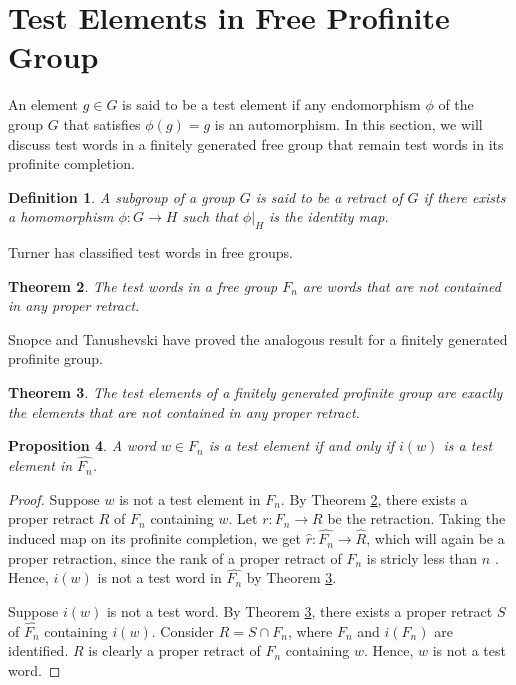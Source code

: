 \documentclass[12pt]{amsart}
\newtheorem{theorem}{Theorem}[section]
\newtheorem{definition}[theorem]{Definition}
\newtheorem{pro}[theorem]{Proposition}
\begin{document}
\section{Test Elements in Free Profinite Group}

An element $g \in G$ is said to be a test element if any endomorphism $\phi$ of the group $G$ that satisfies $\phi(g) = g$ is an automorphism. In this section, we will discuss test words in a finitely generated free group that remain test words in its profinite completion.

\begin{definition}
    A subgroup of a group $G$ is said to be a retract of $G$ if there exists a homomorphism $\phi: G \longrightarrow H$ such that $\phi\vert_H$ is the identity map. 
\end{definition}
Turner has classified test words in free groups.

\begin{theorem}\cite{Turner}\label{turner1}
    The test words in a free group $F_n$ are words that are not contained in any proper retract.
\end{theorem}
Snopce and Tanushevski have proved the analogous result for a finitely generated profinite group.

\begin{theorem}\cite[Theorem~3.5]{snopce2017test}\label{snopce}
The test elements of a finitely generated profinite group are exactly the elements that are not contained in any proper retract.    
\end{theorem}


\begin{pro}\label{prof}
    A word $w \in F_n$ is a test element if and only if $i(w)$ is a test element in $\widehat{F_n}$.  
\end{pro}

\begin{proof}
    Suppose $w$ is not a test element in $F_n$. By Theorem \ref{turner1}, there exists a proper retract $R$ of $F_n$ containing $w$. Let $r: F_n \longrightarrow R$ be the retraction. Taking the induced map on its profinite completion, we get $\widehat{r} : \widehat{F_n} \longrightarrow \widehat{R}$, which will again be a proper retraction, since the rank of a proper retract of $F_n$ is stricly less than $n$ \cite{Turner}. Hence, $i(w)$ is not a test word in $\widehat{F_n}$ by Theorem \ref{snopce}.

    Suppose $i(w)$ is not a test word. By Theorem \ref{snopce}, there exists a proper retract $S$ of $\widehat{F_n}$ containing $i(w)$. Consider $R = S \cap F_n$, where $F_n$ and $i(F_n)$ are identified. $R$ is clearly a proper retract of $F_n$ containing $w$. Hence, $w$ is not a test word.
\end{proof}
\end{document}
